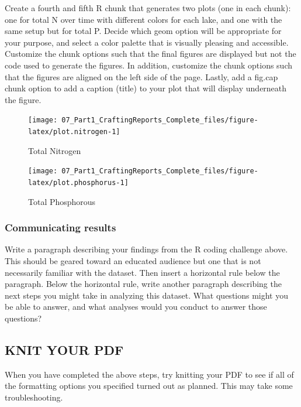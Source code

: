 \documentclass[
]{article}
\begin{document}
Create a fourth and fifth R chunk that generates two plots (one in each
chunk): one for total N over time with different colors for each lake,
and one with the same setup but for total P. Decide which geom option
will be appropriate for your purpose, and select a color palette that is
visually pleasing and accessible. Customize the chunk options such that
the final figures are displayed but not the code used to generate the
figures. In addition, customize the chunk options such that the figures
are aligned on the left side of the page. Lastly, add a fig.cap chunk
option to add a caption (title) to your plot that will display
underneath the figure.

\begin{figure}

\texttt{[image: 07\_Part1\_CraftingReports\_Complete\_files/figure-latex/plot.nitrogen-1]} \hfill{}

\caption{Total Nitrogen}\label{fig:plot.nitrogen}
\end{figure}

\begin{figure}

\texttt{[image: 07\_Part1\_CraftingReports\_Complete\_files/figure-latex/plot.phosphorus-1]} \hfill{}

\caption{Total Phosphorous}\label{fig:plot.phosphorus}
\end{figure}

\hypertarget{communicating-results}{%
\subsubsection{Communicating results}\label{communicating-results}}

Write a paragraph describing your findings from the R coding challenge
above. This should be geared toward an educated audience but one that is
not necessarily familiar with the dataset. Then insert a horizontal rule
below the paragraph. Below the horizontal rule, write another paragraph
describing the next steps you might take in analyzing this dataset. What
questions might you be able to answer, and what analyses would you
conduct to answer those questions?

\hypertarget{knit-your-pdf}{%
\subsection{KNIT YOUR PDF}\label{knit-your-pdf}}

When you have completed the above steps, try knitting your PDF to see if
all of the formatting options you specified turned out as planned. This
may take some troubleshooting.
\end{document}
